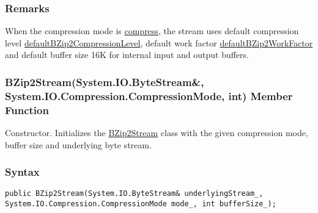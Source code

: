 \documentclass[a4paper,oneside,11.000000pt]{book}
\begin{document}
\subsubsection*{Remarks}
\begin{flushleft}
When the compression mode is \hyperlink{System.IO.Compression.CompressionMode.compress}{compress}, the stream uses default compression level \hyperlink{System.IO.Compression.defaultBZip2CompressionLevel}{defaultBZip2CompressionLevel},
default work factor \hyperlink{System.IO.Compression.defaultBZip2WorkFactor}{defaultBZip2WorkFactor} and default buffer size 16K for internal input and output buffers.

\end{flushleft}
\clearpage

\hypertarget{System.IO.Compression.BZip2Stream.constructor.P.System.IO.Compression.BZip2Stream.R.System.IO.ByteStream.System.IO.Compression.CompressionMode.int}{\subsubsection*{BZip2Stream(System.IO.ByteStream\&, System.IO.Compression.CompressionMode, int) Member Function}}
\begin{flushleft}
Constructor. Initializes the \hyperlink{System.IO.Compression.BZip2Stream}{BZip2Stream} class with the given compression mode, buffer size and underlying byte stream.

\end{flushleft}
\subsubsection*{Syntax}
\texttt{public BZip2Stream(System.IO.ByteStream\& underlyingStream\_, System.IO.Compression.CompressionMode mode\_, int bufferSize\_);}
\end{document}
